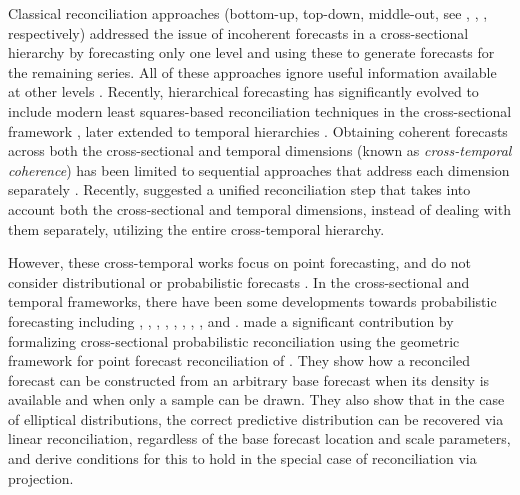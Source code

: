 \documentclass[a4paper,11pt]{article}
\theoremstyle{definition}
\begin{document}
Classical reconciliation approaches (bottom-up, top-down, middle-out, see \citealp{dunn1976}, \citealp{gross1990}, \citealp{athanasopoulos2009}, respectively) addressed the issue of incoherent forecasts in a cross-sectional hierarchy by forecasting only one level and using these to generate forecasts for the remaining series. All of these approaches ignore useful information available at other levels \citep{pennings2017}. Recently, hierarchical forecasting \citep{fliedner2001} has significantly evolved to include modern least squares-based reconciliation techniques in the cross-sectional framework \citep{hyndman2011, wickramasuriya2019, panagiotelis2021}, later extended to temporal hierarchies \citep{athanasopoulos2017, nystrup2020}.
Obtaining coherent forecasts across both the cross-sectional and temporal dimensions (known as \textit{cross-temporal coherence}) has been limited to sequential approaches that address each dimension separately \citep{kourentzes2019, yagli2019, punia2020, spiliotis2020}. Recently, \citet{difonzo2023} suggested a unified reconciliation step that takes into account both the cross-sectional and temporal dimensions, instead of dealing with them separately, utilizing the entire cross-temporal hierarchy.


However, these cross-temporal works focus on point forecasting, and do not consider distributional or probabilistic forecasts \citep{gneiting2014}. In the cross-sectional and temporal frameworks, there have been some developments towards probabilistic forecasting including  \cite{bentaieb2017}, \cite{panamtash2018}, \cite{jeon2019}, \cite{yang2020}, \cite{yagli2020},
\cite{bentaieb2021}, \cite{corani2021}, \cite{corani2022}, \cite{zambon2022} and \cite{wickramasuriya2021b}. \cite{panagiotelis2023} made a significant contribution by formalizing cross-sectional probabilistic reconciliation using the geometric framework for point forecast reconciliation of \cite{panagiotelis2021}. They show how a reconciled forecast can be constructed from an arbitrary base forecast when its density is available and when only a sample can be drawn. They also show that in the case of elliptical distributions, the correct predictive distribution can be recovered via linear reconciliation, regardless of the base forecast location and scale parameters, and derive conditions for this to hold in the special case of reconciliation via projection.
\end{document}
